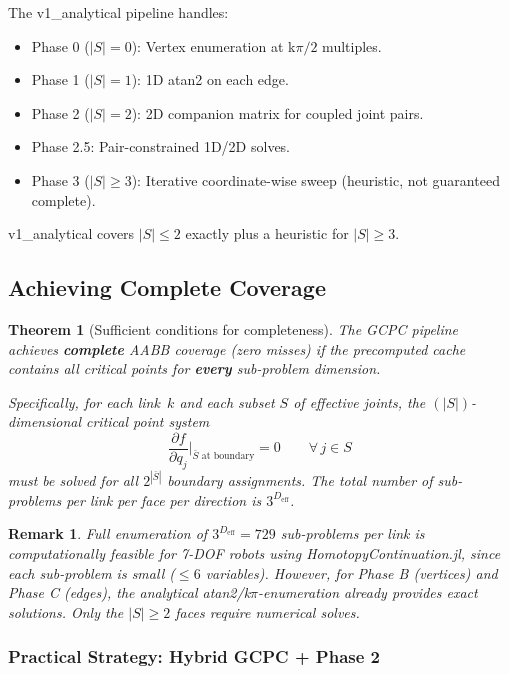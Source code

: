 \documentclass[11pt,a4paper]{article}
\newtheorem{theorem}{Theorem}[section]
\newtheorem{remark}{Remark}[section]
\begin{document}
The v1\_analytical pipeline handles:
\begin{itemize}
  \item Phase 0 ($|S|=0$): Vertex enumeration at k$\pi/2$ multiples.
  \item Phase 1 ($|S|=1$): 1D atan2 on each edge.
  \item Phase 2 ($|S|=2$): 2D companion matrix for coupled joint pairs.
  \item Phase 2.5: Pair-constrained 1D/2D solves.
  \item Phase 3 ($|S| \ge 3$): Iterative coordinate-wise sweep
        (heuristic, not guaranteed complete).
\end{itemize}

v1\_analytical covers $|S| \le 2$ exactly plus a heuristic for
$|S| \ge 3$.

\subsection{Achieving Complete Coverage}

\begin{theorem}[Sufficient conditions for completeness]\label{thm:complete}
The GCPC pipeline achieves \textbf{complete} AABB coverage (zero
misses) if the precomputed cache contains all critical points
for \textbf{every} sub-problem dimension.

Specifically, for each link~$k$ and each subset $S$ of effective joints,
the $(|S|)$-dimensional critical point system
\[
  \frac{\partial f}{\partial q_j}\biggr|_{\bar{S}\text{ at boundary}} = 0
  \qquad \forall\, j \in S
\]
must be solved for all $2^{|\bar{S}|}$ boundary assignments.
The total number of sub-problems per link per face per direction is $3^{D_\text{eff}}$.
\end{theorem}

\begin{remark}
Full enumeration of $3^{D_\text{eff}} = 729$ sub-problems per link is
computationally feasible for 7-DOF robots using
HomotopyContinuation.jl, since each sub-problem is small
($\le 6$ variables). However, for Phase B (vertices) and Phase C (edges),
the analytical atan2/k$\pi$-enumeration already provides exact
solutions. Only the $|S| \ge 2$ faces require numerical solves.
\end{remark}

\subsubsection{Practical Strategy: Hybrid GCPC + Phase 2}
\end{document}

